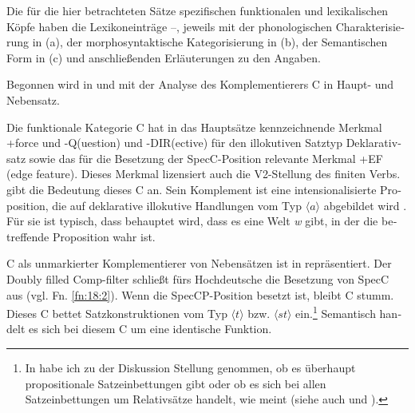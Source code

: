 \documentclass[output=paper, colorlinks, citecolor=brown, booklanguage=german]{langscibook}
\begin{document}
\begin{otherlanguage}{german}
Die für die hier betrachteten Sätze spezifischen funktionalen und le\-xi\-ka\-li\-schen Köpfe haben die Lexikoneinträge --, jeweils mit der phonologischen Cha\-rak\-te\-ri\-sie\-rung in (a), der morphosyntaktische Kategorisierung in (b), der Semantischen Form in (c) und anschließenden Erläuterungen zu den Angaben.

Begonnen wird in  und  mit der Analyse des Komplementierers C in Haupt- und Nebensatz.

\ea \label{ex:18:16}
	\ea{ \label{ex:18:16a} $\varnothing$
    }
	\z
\z

\noindent Die funktionale Kategorie C hat in  das Hauptsätze kennzeichnende Merkmal +force und -Q(uestion) und -DIR(ective) für den illokutiven Satztyp De\-kla\-ra\-tiv\-satz sowie das für die Besetzung der SpecC-Position relevante Merkmal +EF (edge feature). Dieses Merkmal lizensiert auch die V2-Stellung des finiten Verbs.  gibt die Bedeutung dieses C an. Sein Komplement ist eine intensionalisierte Proposition, die auf deklarative illokutive Handlungen vom Typ $\langle a\rangle$ abgebildet wird \citep[vgl.][]{Krifka2001}. Für sie ist typisch, dass behauptet wird, dass es eine Welt \textit{w} gibt, in der die betreffende Proposition wahr ist.

\ea \label{ex:18:17}
	\z
\z

\noindent C als unmarkierter Komplementierer von Nebensätzen ist in  repräsentiert. Der Doubly filled Comp-filter schließt fürs Hochdeutsche die Besetzung von SpecC aus (vgl. Fn. \ref{fn:18:2}). Wenn die SpecCP-Position besetzt ist, bleibt C stumm. Dieses C bettet Satzkonstruktionen vom Typ $\langle t \rangle$ bzw. $\langle st\rangle$ ein.\footnote{\label{fn:18:3}In \citet{Zimmermann2015} habe ich zu der Diskussion Stellung genommen, ob es überhaupt propositionale Satzeinbettungen gibt oder ob es sich bei allen Satzeinbettungen um Relativsätze handelt, wie \citet{Moulton2014,Moulton2015} meint (siehe auch \citealt{Capoingro-Polinsky2011} und \citealt{Kratzer2006,Kratzer2011,Kratzer2015}).} Semantisch handelt es sich bei diesem C um eine identische Funktion.


\end{otherlanguage}
\end{document}
